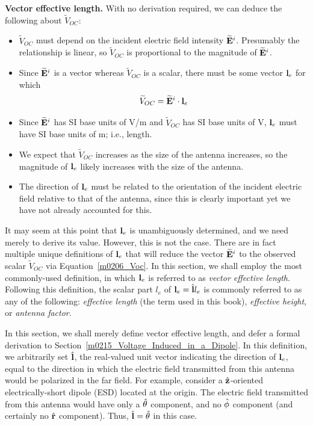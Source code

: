 {\bf Vector effective length.} 
With no derivation required, we can deduce the following about $\widetilde{V}_{OC}$:
%
\begin{itemize}
\item $\widetilde{V}_{OC}$ must depend on the incident electric field intensity $\widetilde{\bf E}^i$.  Presumably the relationship is linear, so $\widetilde{V}_{OC}$ is proportional to the magnitude of $\widetilde{\bf E}^i$.
\item Since $\widetilde{\bf E}^i$ is a vector whereas $\widetilde{V}_{OC}$ is a scalar, there must be some vector ${\bf l}_e$ for which
%
\begin{equation}
\widetilde{V}_{OC}=\widetilde{\bf E}^i\cdot{\bf l}_e
\label{m0206_Voc}
\end{equation}
\item Since $\widetilde{\bf E}^i$ has SI base units of V/m and $\widetilde{V}_{OC}$ has SI base units of V, ${\bf l}_e$ must have SI base units of m; i.e., length.
\item We expect that $\widetilde{V}_{OC}$ increases as the size of the antenna increases, so the magnitude of ${\bf l}_e$ likely increases with the size of the antenna.
\item The direction of ${\bf l}_e$ must be related to the orientation of the incident electric field relative to that of the antenna, since this is clearly important yet we have not already accounted for this.
\end{itemize}
%
It may seem at this point that ${\bf l}_e$ is unambiguously determined, and we need merely to derive its value.
However, this is not the case. 
There are in fact multiple unique definitions of ${\bf l}_e$ that will reduce the vector $\widetilde{\bf E}^i$ to the observed scalar $\widetilde{V}_{OC}$ via Equation~\ref{m0206_Voc}.
In this section, we shall employ the most commonly-used definition, in which ${\bf l}_e$ is referred to as \emph{vector effective length}. 
Following this definition, the scalar part $l_e$ of ${\bf l}_e=\hat{\bf l} l_e$ is commonly referred to as any of the following:
\emph{effective length} (the term used in this book), 
\emph{effective height},
or \emph{antenna factor}.

In this section, we shall merely define vector effective length, and defer a formal derivation to Section~\ref{m0215_Voltage_Induced_in_a_Dipole}.
In this definition, we arbitrarily set $\hat{\bf l}$, the real-valued unit vector indicating the direction of ${\bf l}_e$, equal to the direction in which the electric field transmitted from this antenna would be polarized in the far field.
For example, consider a $\hat{\bf z}$-oriented electrically-short dipole (ESD) located at the origin.  
The electric field transmitted from this antenna would have only a $\hat{\bf \theta}$ component, and no $\hat{\bf \phi}$ component (and certainly no $\hat{\bf r}$ component).
Thus, $\hat{\bf l}=\hat{\bf \theta}$ in this case.

